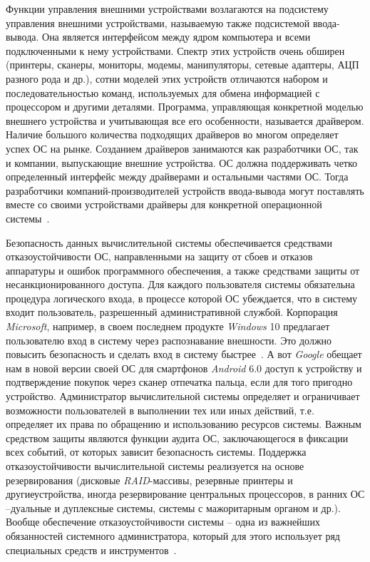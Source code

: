 Функции управления внешними устройствами возлагаются на подсистему управления внешними устройствами, называемую также подсистемой ввода-вывода.   Она   является   интерфейсом   между   ядром   компьютера   и   всеми подключенными к нему устройствами. Спектр этих устройств очень обширен (принтеры, сканеры, мониторы, модемы, манипуляторы, сетевые адаптеры, АЦП разного рода и др.), сотни моделей этих устройств отличаются набором и последовательностью   команд,   используемых   для   обмена   информацией   с процессором   и   другими   деталями.   Программа,   управляющая   конкретной моделью внешнего устройства и учитывающая все его особенности, называется драйвером. Наличие большого количества подходящих драйверов во многом определяет   успех   ОС   на   рынке.   Созданием   драйверов   занимаются   как разработчики ОС, так и компании, выпускающие внешние устройства. ОС должна поддерживать четко определенный интерфейс между драйверами и остальными   частями   ОС.   Тогда   разработчики   компаний-производителей устройств ввода-вывода могут поставлять вместе со своими устройствами драйверы для конкретной операционной системы~\cite{Oc2}.

Безопасность   данных   вычислительной   системы   обеспечивается средствами отказоустойчивости ОС, направленными на защиту от сбоев и отказов аппаратуры и ошибок программного обеспечения, а также средствами защиты от несанкционированного доступа. Для каждого пользователя системы обязательна процедура логического входа, в процессе которой ОС убеждается, что в систему входит пользователь, разрешенный административной службой. Корпорация  \textit{Microsoft}, например, в своем последнем продукте  \textit{Windows} 10 предлагает пользователю вход в систему через распознавание внешности. Это должно повысить безопасность и сделать вход в систему быстрее~\cite{linuxOffDoc}. А вот  \textit{Google}  обещает нам в новой версии своей ОС для смартфонов \textit{Android}  6.0  доступ   к   устройству  и   подтверждение   покупок   через   сканер отпечатка пальца, если для того пригодно устройство. Администратор   вычислительной   системы   определяет   и   ограничивает возможности   пользователей   в   выполнении   тех   или   иных   действий,   т.е. определяет   их   права   по   обращению   и   использованию   ресурсов   системы. Важным средством защиты являются функции аудита ОС, заключающегося в фиксации всех событий, от которых зависит безопасность системы. Поддержка отказоустойчивости   вычислительной   системы   реализуется   на   основе резервирования   (дисковые   \textit{RAID}-массивы,   резервные   принтеры   и   другиеустройства, иногда резервирование центральных процессоров, в ранних ОС –дуальные и дуплексные системы, системы с мажоритарным органом и др.). Вообще   обеспечение   отказоустойчивости   системы   –   одна   из   важнейших обязанностей системного администратора, который для этого использует ряд специальных средств и инструментов~\cite{Oc2}.

